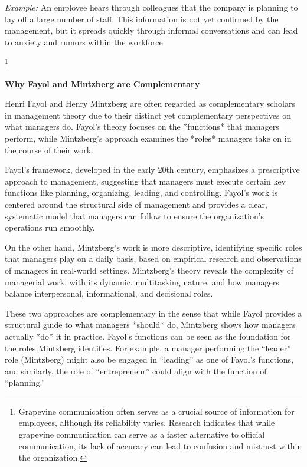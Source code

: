 \documentclass[12pt,a4paper]{book}
\begin{document}
\textit{Example:} An employee hears through colleagues that the company is planning to lay off a large number of staff. This information is not yet confirmed by the management, but it spreads quickly through informal conversations and can lead to anxiety and rumors within the workforce.

\footnote{Grapevine communication often serves as a crucial source of information for employees, although its reliability varies. Research indicates that while grapevine communication can serve as a faster alternative to official communication, its lack of accuracy can lead to confusion and mistrust within the organization.}

\vspace{1cm}

\textbf{Why Fayol and Mintzberg are Complementary}

Henri Fayol and Henry Mintzberg are often regarded as complementary scholars in management theory due to their distinct yet complementary perspectives on what managers do. Fayol's theory focuses on the *functions* that managers perform, while Mintzberg’s approach examines the *roles* managers take on in the course of their work.

Fayol's framework, developed in the early 20th century, emphasizes a prescriptive approach to management, suggesting that managers must execute certain key functions like planning, organizing, leading, and controlling. Fayol’s work is centered around the structural side of management and provides a clear, systematic model that managers can follow to ensure the organization’s operations run smoothly.

On the other hand, Mintzberg’s work is more descriptive, identifying specific roles that managers play on a daily basis, based on empirical research and observations of managers in real-world settings. Mintzberg’s theory reveals the complexity of managerial work, with its dynamic, multitasking nature, and how managers balance interpersonal, informational, and decisional roles.

These two approaches are complementary in the sense that while Fayol provides a structural guide to what managers *should* do, Mintzberg shows how managers actually *do* it in practice. Fayol’s functions can be seen as the foundation for the roles Mintzberg identifies. For example, a manager performing the “leader” role (Mintzberg) might also be engaged in “leading” as one of Fayol’s functions, and similarly, the role of “entrepreneur” could align with the function of “planning.”
\end{document}
